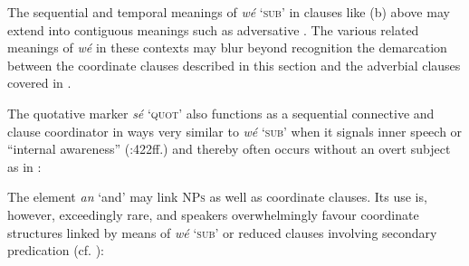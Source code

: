 The sequential and temporal meanings of \textit{wé} ‘\textsc{sub}’ in clauses like (b) above may extend into contiguous meanings such as adversative . The various related meanings of \textit{wé} in these contexts may blur beyond recognition the demarcation between the coordinate clauses described in this section and the adverbial clauses covered in .


\ea%
    \label{ex:key:1363}
\z\z

The quotative marker \textit{sé} ‘\textsc{quot}’ also functions as a sequential connective and clause coordinator in ways very similar to \textit{wé} ‘\textsc{sub}’ when it signals inner speech or “internal awareness” (\citealt{Güldemann2008}:422ff.) and thereby often occurs without an overt subject as in :


\ea%
    \label{ex:key:1364}
\z\z

The element \textit{an} ‘and’ may link \textsc{NPs} as well as coordinate clauses. Its use is, however, exceedingly rare, and speakers overwhelmingly favour coordinate structures linked by means of \textit{wé} ‘\textsc{sub}’ or reduced clauses involving secondary predication (cf. ):


